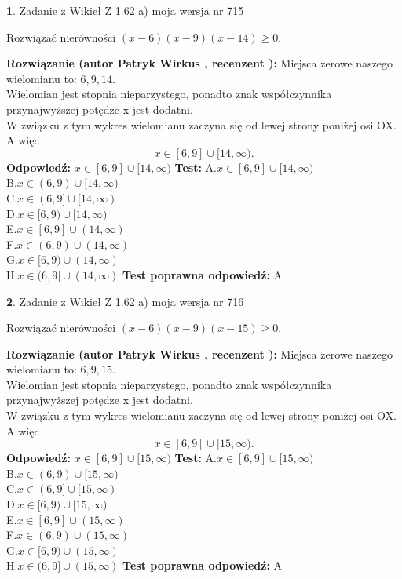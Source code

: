 \documentclass[12pt, a4paper]{article}
\theoremstyle{definition} %
\newtheorem{zad}{}
\newcommand{\zadStart}[1]{\begin{zad}#1\newline}
\newcommand{\zadStop}{\end{zad}}
\newcommand{\rozwStart}[2]{\noindent \textbf{Rozwiązanie (autor #1 , recenzent #2): }\newline}
\newcommand{\rozwStop}{\newline}
\newcommand{\odpStart}{\noindent \textbf{Odpowiedź:}\newline}
\newcommand{\odpStop}{\newline}
\newcommand{\testStart}{\noindent \textbf{Test:}\newline}
\newcommand{\testStop}{\newline}
\newcommand{\kluczStart}{\noindent \textbf{Test poprawna odpowiedź:}\newline}
\newcommand{\kluczStop}{\newline}
\begin{document}
\zadStart{Zadanie z Wikieł Z 1.62 a) moja wersja nr 715}

Rozwiązać nierówności $(x-6)(x-9)(x-14)\ge0$.
\zadStop
\rozwStart{Patryk Wirkus}{}
Miejsca zerowe naszego wielomianu to: $6, 9, 14$.\\
Wielomian jest stopnia nieparzystego, ponadto znak współczynnika przy\linebreak najwyższej potędze x jest dodatni.\\ W związku z tym wykres wielomianu zaczyna się od lewej strony poniżej osi OX. A więc $$x \in [6,9] \cup [14,\infty).$$
\rozwStop
\odpStart
$x \in [6,9] \cup [14,\infty)$
\odpStop
\testStart
A.$x \in [6,9] \cup [14,\infty)$\\
B.$x \in (6,9) \cup [14,\infty)$\\
C.$x \in (6,9] \cup [14,\infty)$\\
D.$x \in [6,9) \cup [14,\infty)$\\
E.$x \in [6,9] \cup (14,\infty)$\\
F.$x \in (6,9) \cup (14,\infty)$\\
G.$x \in [6,9) \cup (14,\infty)$\\
H.$x \in (6,9] \cup (14,\infty)$
\testStop
\kluczStart
A
\kluczStop



\zadStart{Zadanie z Wikieł Z 1.62 a) moja wersja nr 716}

Rozwiązać nierówności $(x-6)(x-9)(x-15)\ge0$.
\zadStop
\rozwStart{Patryk Wirkus}{}
Miejsca zerowe naszego wielomianu to: $6, 9, 15$.\\
Wielomian jest stopnia nieparzystego, ponadto znak współczynnika przy\linebreak najwyższej potędze x jest dodatni.\\ W związku z tym wykres wielomianu zaczyna się od lewej strony poniżej osi OX. A więc $$x \in [6,9] \cup [15,\infty).$$
\rozwStop
\odpStart
$x \in [6,9] \cup [15,\infty)$
\odpStop
\testStart
A.$x \in [6,9] \cup [15,\infty)$\\
B.$x \in (6,9) \cup [15,\infty)$\\
C.$x \in (6,9] \cup [15,\infty)$\\
D.$x \in [6,9) \cup [15,\infty)$\\
E.$x \in [6,9] \cup (15,\infty)$\\
F.$x \in (6,9) \cup (15,\infty)$\\
G.$x \in [6,9) \cup (15,\infty)$\\
H.$x \in (6,9] \cup (15,\infty)$
\testStop
\kluczStart
A
\kluczStop
\end{document}
